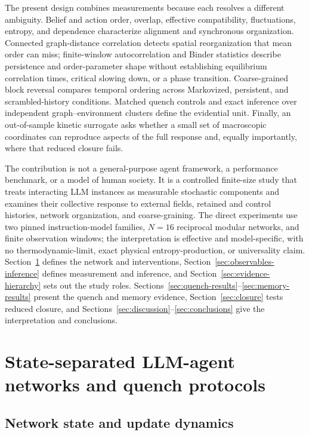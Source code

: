 \documentclass[12pt]{article}
\begin{document}
The present design combines measurements because each resolves a different
ambiguity.  Belief and action order, overlap, effective compatibility,
fluctuations, entropy, and dependence characterize alignment and synchronous
organization.  Connected graph-distance correlation detects spatial
reorganization that mean order can miss; finite-window autocorrelation and
Binder statistics describe persistence and order-parameter shape without
establishing equilibrium correlation times, critical slowing down, or a phase
transition.  Coarse-grained block reversal compares temporal ordering across
Markovized, persistent, and scrambled-history conditions.  Matched quench
controls and exact inference over independent graph--environment clusters
define the evidential unit.  Finally, an out-of-sample kinetic surrogate asks
whether a small set of macroscopic coordinates can reproduce aspects of the
full response and, equally importantly, where that reduced closure fails.

The contribution is not a general-purpose agent framework, a performance
benchmark, or a model of human society.  It is a controlled finite-size study
that treats interacting LLM instances as measurable stochastic components and
examines their collective response to external fields, retained and control
histories, network organization, and coarse-graining.  The direct experiments
use two pinned instruction-model families, $N=16$ reciprocal modular networks,
and finite observation windows; the interpretation is effective and
model-specific, with no thermodynamic-limit, exact physical
entropy-production, or universality claim.  Section~\ref{sec:system-protocol}
defines the network and interventions, Section~\ref{sec:observables-inference}
defines measurement and inference, and Section~\ref{sec:evidence-hierarchy}
sets out the study roles.  Sections~\ref{sec:quench-results}--\ref{sec:memory-results}
present the quench and memory evidence, Section~\ref{sec:closure} tests reduced
closure, and Sections~\ref{sec:discussion}--\ref{sec:conclusions} give the
interpretation and conclusions.

\section{State-separated LLM-agent networks and quench protocols}
\label{sec:system-protocol}

\subsection{Network state and update dynamics}
\label{sec:state}
\end{document}
